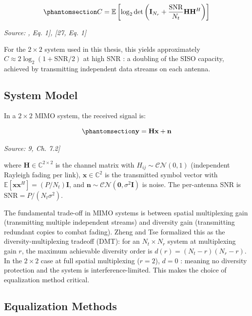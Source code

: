 \begin{equation}\protect\phantomsection\label{eq:mimo-capacity}{C = \mathbb{E}\left[\log_2 \det\left(\mathbf{I}_{N_r} + \frac{\text{SNR}}{N_t}\mathbf{H}\mathbf{H}^H\right)\right]
}\end{equation} \par{\small\textit{Source: \cite{Telatar1999MIMO}, Eq. 1], [27, Eq. 1]}}

For the \(2 \times 2\) system used in this thesis, this yields approximately \(C \approx 2\log_2(1 + \text{SNR}/2)\) at high SNR : a doubling of the SISO capacity, achieved by transmitting independent data streams on each antenna.

\subsection{System Model}\label{sec:system-model}

In a \(2 \times 2\) MIMO system, the received signal is:

\begin{equation}\protect\phantomsection\label{eq:mimo-received}{\mathbf{y} = \mathbf{H}\mathbf{x} + \mathbf{n}
}\end{equation} \par{\small\textit{Source: \cite{Laneman2004CooperativeDiversity}9, Ch. 7.2]}}

where \(\mathbf{H} \in \mathbb{C}^{2 \times 2}\) is the channel matrix with \(H_{ij} \sim \mathcal{CN}(0, 1)\) (independent Rayleigh fading per link), \(\mathbf{x} \in \mathbb{C}^{2}\) is the transmitted symbol vector with \(\mathbb{E}[\mathbf{x}\mathbf{x}^H] = (P/N_t)\mathbf{I}\), and \(\mathbf{n} \sim \mathcal{CN}(\mathbf{0}, \sigma^2\mathbf{I})\) is noise. The per-antenna SNR is \(\text{SNR} = P/(N_t \sigma^2)\).

The fundamental trade-off in MIMO systems is between spatial multiplexing gain (transmitting multiple independent streams) and diversity gain (transmitting redundant copies to combat fading). Zheng and Tse \cite{ZhengTse2003DMT} formalized this as the diversity-multiplexing tradeoff (DMT): for an \(N_t \times N_r\) system at multiplexing gain \(r\), the maximum achievable diversity order is \(d(r) = (N_t - r)(N_r - r)\). In the \(2 \times 2\) case at full spatial multiplexing (\(r = 2\)), \(d = 0\) : meaning no diversity protection and the system is interference-limited. This makes the choice of equalization method critical.

\subsection{Equalization Methods}\label{sec:equalization-methods}

